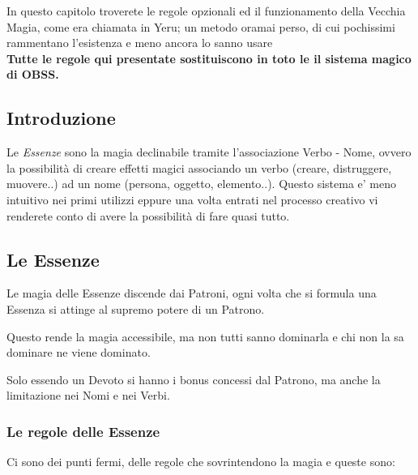 \documentclass[a4paper,twoside,openany]{book}
\begin{document}
\begin{multicols}{2}

\begin{changemargin}{0.3cm}{0.3cm}\begin{narratore}

In questo capitolo troverete le regole opzionali ed il funzionamento della Vecchia Magia, come era chiamata in Yeru; un metodo oramai perso, di cui pochissimi rammentano l'esistenza e meno ancora lo sanno usare\\

\textbf{Tutte le regole qui presentate sostituiscono in toto le il sistema magico di OBSS.}

\end{narratore}\end{changemargin}

\subsection{Introduzione}

Le \textit{Essenze} sono la magia declinabile tramite l'associazione Verbo - Nome, ovvero la possibilità di creare effetti magici associando un verbo (creare, distruggere, muovere..) ad un nome (persona, oggetto, elemento..). Questo sistema e' meno intuitivo nei primi utilizzi eppure una volta entrati nel processo creativo vi renderete conto di avere la possibilità di fare quasi tutto.

\subsection{Le Essenze}

Le magia delle Essenze discende dai Patroni, ogni volta che si formula una Essenza si attinge al supremo potere di un Patrono.

Questo rende la magia accessibile, ma non tutti sanno dominarla e chi non la sa dominare ne viene dominato.

Solo essendo un Devoto si hanno i bonus concessi dal Patrono, ma anche la limitazione nei Nomi e nei Verbi. 

\subsubsection{Le regole delle Essenze}

\label{le-regole-delle-essenze}

Ci sono dei punti fermi, delle regole che sovrintendono la magia e queste sono:


\end{multicols}
\end{document}
